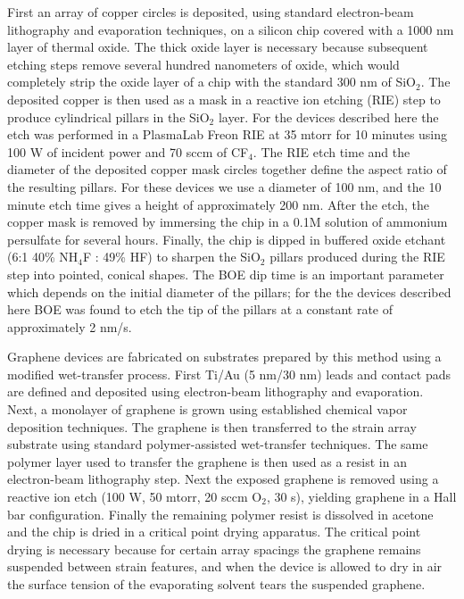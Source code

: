 \documentclass[edeposit,fullpage,draftthesis]{uiucthesis2009}
\begin{document}
\begin{appendices}
            First an array of copper circles is deposited, using standard electron-beam lithography and evaporation techniques, 
            on a silicon chip covered with a 1000 nm layer of thermal oxide. 
            The thick oxide layer is necessary because subsequent etching steps remove several hundred nanometers of oxide, 
            which would completely strip the oxide layer of a chip with the standard 300 nm of SiO$_2$.
            The deposited copper is then used as a mask in a reactive ion etching 
            (RIE) step to produce cylindrical pillars in the SiO$_2$ layer. 
            For the devices described here the etch was performed in 
            a PlasmaLab Freon RIE at 35 mtorr for 10 minutes 
            using 100 W of incident power and 70 sccm of CF$_4$. 
            The RIE etch time and the diameter of the deposited copper mask circles together 
            define the aspect ratio of the resulting 
            pillars. For these devices we use a diameter of 100 nm, and the 10 minute etch 
            time gives a height of approximately 200 nm.
            After the etch, the copper mask is removed by immersing the chip 
            in a 0.1M solution of ammonium persulfate for several hours. Finally, the chip is dipped in buffered oxide etchant 
            (6:1 40\% NH$_4$F : 49\% HF) to sharpen the SiO$_2$ pillars produced during the RIE step into pointed, conical shapes. 
            The BOE dip time is an important parameter which depends on the initial diameter of the pillars; for the the devices
            described here BOE was found to etch the tip of the pillars at a constant rate of approximately 2 nm/s. 
            
            Graphene devices are fabricated on substrates prepared by this method using a modified wet-transfer process.
            First Ti/Au (5 nm/30 nm) leads and contact pads are defined and deposited using 
            electron-beam lithography and evaporation. 
            Next, a monolayer of graphene is grown using established chemical vapor deposition techniques\cite{Li2009}. 
            The graphene is then transferred to the strain array substrate using standard polymer-assisted wet-transfer 
            techniques\cite{li2009transfer}. The same polymer layer used to transfer the graphene is then used as a 
            resist in an electron-beam lithography step. Next the exposed graphene is removed using a reactive ion etch 
            (100 W, 50 mtorr, 20 sccm O$_2$, 30 s), yielding graphene in a Hall bar configuration. Finally the remaining 
            polymer resist is dissolved in acetone and the chip is dried in a critical point drying apparatus. 
            The critical point drying is necessary because for certain array spacings the graphene remains suspended between
            strain features, and when the device is allowed to dry in air the surface tension 
            of the evaporating solvent tears the suspended graphene.
 

\end{appendices}
\end{document}
